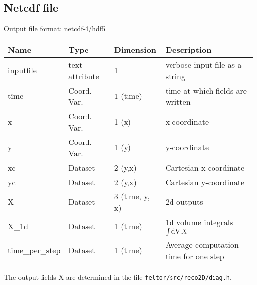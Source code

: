 \subsection{Netcdf file}
Output file format: netcdf-4/hdf5

\begin{longtable}{lll>{\RaggedRight}p{7cm}}
\toprule
\rowcolor{gray!50}\textbf{Name} &  \textbf{Type} & \textbf{Dimension} & \textbf{Description}  \\ \midrule
inputfile        & text attribute & 1 & verbose input file as a string \\
time             & Coord. Var. & 1 (time) & time at which fields are written \\
x                & Coord. Var. & 1 (x) & x-coordinate  \\
y                & Coord. Var. & 1 (y) & y-coordinate \\
xc               & Dataset & 2 (y,x) & Cartesian x-coordinate  \\
yc               & Dataset & 2 (y,x) & Cartesian y-coordinate \\
X                & Dataset & 3 (time, y, x) & 2d outputs \\
X\_1d            & Dataset & 1 (time) & 1d volume integrals $\int \mathrm{dV}\, X$ \\
time\_per\_step  & Dataset & 1 (time) & Average computation time for one step \\
\bottomrule
\end{longtable}
The output fields X are determined in the file \texttt{feltor/src/reco2D/diag.h}.



